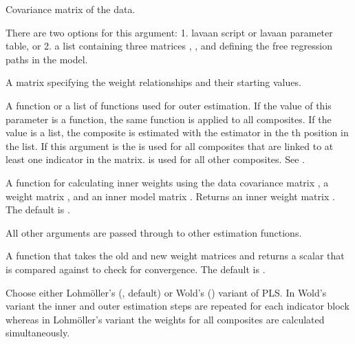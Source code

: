\documentclass[a4paper]{book}
\begin{document}
\begin{Arguments}
\begin{ldescription}
\item[\code{S}] Covariance matrix of the data.

\item[\code{model}] There are two options for this argument: 1. lavaan script or lavaan parameter
table, or 2. a list containing three matrices
, , and  defining the free regression paths
in the model.

\item[\code{W.model}] A matrix specifying the weight relationships and their starting values.

\item[\code{outerEstim}] A function or a list of functions used for outer estimation. If
the value of this parameter is a function, the same function is applied to all
composites. If the value is a list, the composite  is estimated
with the estimator in the th position in the list. If this argument is
 the  is used for all composites that are linked to at least
one indicator in the  matrix. is used for all other
composites. See .

\item[\code{innerEstim}] A function for calculating inner weights using  the data covariance matrix
, a weight matrix , and an inner model matrix . Returns
an inner weight matrix . The default is .

\item[\code{...}] All other arguments are passed through to other estimation functions.

\item[\code{convCheck}] A function that takes the old  and new weight  matrices and
returns a scalar that is compared against  to check for convergence. The default
is .

\item[\code{variant}] Choose either Lohmöller's (, default) or Wold's () 
variant of PLS. In Wold's variant the inner and outer estimation steps are repeated for each
indicator block whereas in Lohmöller's variant the weights for all composites are calculated
simultaneously.


\end{ldescription}
\end{Arguments}
\end{document}
